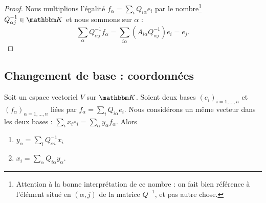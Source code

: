 \begin{proof}
    Nous multiplions l'égalité \( f_{\alpha}=\sum_iQ_{i\alpha}e_i\) par le nombre\footnote{Attention à la bonne interprétation de ce nombre : on fait bien référence à l'élément situé en \( (\alpha, j) \) de la matrice \( Q^{-1} \), et pas autre chose.} \( Q^{-1}_{\alpha j}\in \eK\)  et nous sommons sur \( \alpha\) :
    \begin{equation}
        \sum_{\alpha}Q^{-1}_{\alpha j}f_{\alpha}=\sum_{i\alpha}(A_{i\alpha}Q^{-1}_{\alpha j})e_i=e_j.
    \end{equation}
\end{proof}

\subsection{Changement de base : coordonnées}

\begin{proposition}     \label{PROPooNYYOooHqHryX}
    Soit un espace vectoriel \( V\) sur \( \eK\). Soient deux bases \( (e_i)_{i=1,\ldots, n}\) et \( (f_{\alpha})_{\alpha=1,\ldots, n}\) liées par \( f_{\alpha}=\sum_iQ_{i\alpha}e_i\). Nous considérons un même vecteur dans les deux bases : \( \sum_ix_ie_i=\sum_{\alpha}y_{\alpha}f_{\alpha}\). Alors
    \begin{enumerate}
        \item       \label{ITEMooIBAEooNaUnPD}
            \( y_{\alpha}=\sum_iQ^{-1}_{\alpha i}x_i\)
        \item       \label{ITEMooKPWTooMwdbPu}
            $x_i=\sum_{\alpha}Q_{i\alpha}y_{\alpha}$.
    \end{enumerate}
\end{proposition}

